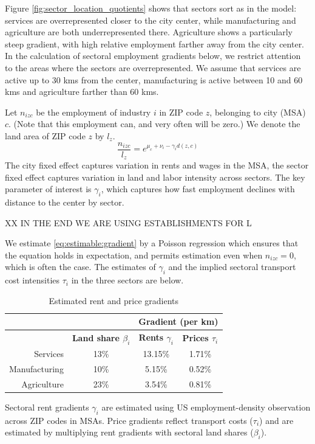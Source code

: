 \documentclass[12pt]{article}
\begin{document}
Figure \ref{fig:sector_location_quotients} shows that sectors sort as in the model: services are overrepresented closer to the city center, while manufacturing and agriculture are both underrepresented there. Agriculture shows a particularly steep gradient, with high relative employment farther away from the city center. In the calculation of sectoral employment gradients below, we restrict attention to the areas where the sectors are overrepresented. We assume that services are active up to 30 kms from the center, manufacturing is active between 10 and 60 kms and agriculture farther than 60 kms.

Let $n_{izc}$ be the employment of industry $i$ in ZIP code $z$, belonging to city (MSA) $c$. (Note that this employment can, and very often will be zero.) We denote the land area of ZIP code $z$ by $l_z$.
\begin{equation}\label{eq:estimable:gradient}
\frac{n_{izc}}{l_z} = e^{\mu_c+\nu_i-\gamma_i d(z,c)}
\end{equation}
The city fixed effect captures variation in rents and wages in the MSA, the sector fixed effect captures variation in land and labor intensity across sectors. %
The key parameter of interest is $\gamma_i$, which captures how fast employment declines with distance to the center by sector.

XX IN THE END WE ARE USING ESTABLISHMENTS FOR L

We estimate \eqref{eq:estimable:gradient} by a Poisson regression which ensures that the equation holds in expectation, and permits estimation even when $n_{izc}=0$, which is often the case. The estimates of $\gamma_i$ and the implied sectoral transport cost intensities $\tau_i$ in the three sectors are below.

\begin{table}[h!]
  \begin{center}
  \caption{Estimated rent and price gradients}
    \begin{tabular}{rccc}
    \toprule
    \textbf{} & \textbf{} & \multicolumn{2}{c}{\textbf{Gradient (per km)}}\\
    \midrule
    \textbf{} & \textbf{Land share $\beta_i$ } & \textbf{Rents $\gamma_i$} & \textbf{Prices $\tau_i$} \\
    Services & 13\%  & 13.15\% & 1.71\% \\
    Manufacturing & 10\%  & 5.15\% & 0.52\% \\
    Agriculture & 23\%  & 3.54\% & 0.81\% \\
    \bottomrule
    \end{tabular}%

  \end{center}
  \label{tab:EmpGrad}%

  \noindent \footnotesize{Sectoral rent gradients $\gamma_i$ are estimated using US employment-density observation across ZIP codes in MSAs. Price gradients reflect transport costs ($\tau_i$) and are estimated by multiplying rent gradients with sectoral land shares ($\beta_i$). }
\end{table}%
\end{document}
